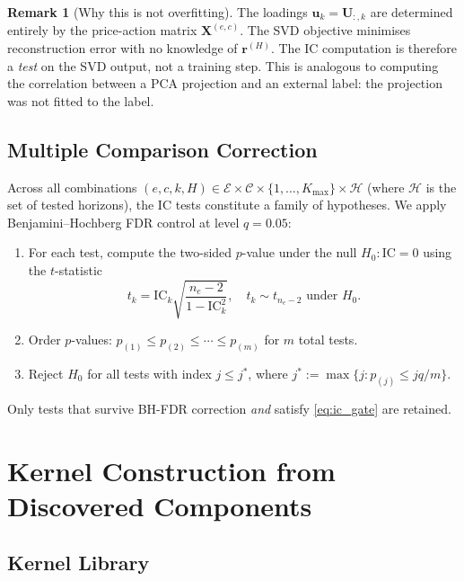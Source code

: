 \documentclass[11pt,a4paper]{article}
\theoremstyle{definition}
\newtheorem{remark}{Remark}[section]
\theoremstyle{plain}
\newcommand{\Xmat}{\mathbf{X}}
\newcommand{\Umat}{\mathbf{U}}
\newcommand{\bvec}[1]{\mathbf{#1}}
\begin{document}
\begin{remark}[Why this is not overfitting]
The loadings $\bvec{u}_k = \Umat_{:,k}$ are determined entirely by the price-action
matrix $\Xmat^{(e,c)}$. The SVD objective minimises reconstruction error with no
knowledge of $\bvec{r}^{(H)}$. The IC computation is therefore a \emph{test} on the SVD
output, not a training step. This is analogous to computing the correlation between a
PCA projection and an external label: the projection was not fitted to the label.
\end{remark}

\subsection{Multiple Comparison Correction}

Across all combinations $(e, c, k, H) \in \mathcal{E} \times \mathcal{C} \times
\{1,\ldots,K_{\max}\} \times \mathcal{H}$ (where $\mathcal{H}$ is the set of tested
horizons), the IC tests constitute a family of hypotheses. We apply
Benjamini--Hochberg FDR control at level $q = 0.05$:
\begin{enumerate}
    \item For each test, compute the two-sided $p$-value under the null
          $H_0\colon \mathrm{IC} = 0$ using the $t$-statistic
          \begin{equation}
              t_k = \mathrm{IC}_k
                    \sqrt{\frac{n_e - 2}{1 - \mathrm{IC}_k^2}},
              \quad t_k \sim t_{n_e-2} \text{ under } H_0.
              \label{eq:ic_tstat}
          \end{equation}
    \item Order $p$-values: $p_{(1)} \leq p_{(2)} \leq \cdots \leq p_{(m)}$ for $m$
          total tests.
    \item Reject $H_0$ for all tests with index $j \leq j^*$, where
          $j^* := \max\{j : p_{(j)} \leq jq/m\}$.
\end{enumerate}
Only tests that survive BH-FDR correction \emph{and} satisfy \eqref{eq:ic_gate} are
retained.

\section{Kernel Construction from Discovered Components}
\label{sec:kernels}

\subsection{Kernel Library}
\end{document}
